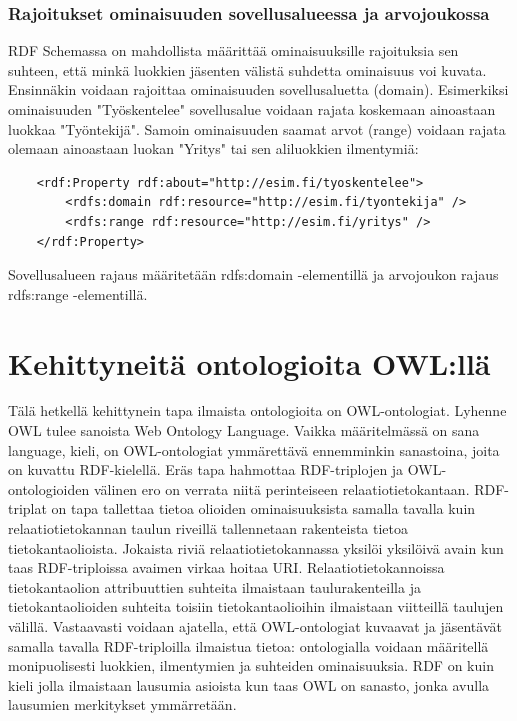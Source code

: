 \documentclass[finnish]{tktltiki2}
\theoremstyle{definition}
\theoremstyle{remark}
\begin{document}
\subsubsection{Rajoitukset ominaisuuden sovellusalueessa ja arvojoukossa}
RDF Schemassa on mahdollista määrittää ominaisuuksille rajoituksia sen suhteen, että minkä luokkien jäsenten välistä suhdetta ominaisuus voi kuvata. Ensinnäkin
voidaan rajoittaa ominaisuuden sovellusaluetta (domain). Esimerkiksi ominaisuuden "Työskentelee" sovellusalue voidaan rajata koskemaan ainoastaan luokkaa "Työntekijä". Samoin 
ominaisuuden saamat arvot (range) voidaan rajata olemaan ainoastaan luokan "Yritys" tai sen aliluokkien ilmentymiä: 
\begin{verbatim}
    <rdf:Property rdf:about="http://esim.fi/tyoskentelee">
        <rdfs:domain rdf:resource="http://esim.fi/tyontekija" />
        <rdfs:range rdf:resource="http://esim.fi/yritys" />
    </rdf:Property>
\end{verbatim}
Sovellusalueen rajaus määritetään rdfs:domain -elementillä ja arvojoukon rajaus rdfs:range -elementillä.  

\section{Kehittyneitä ontologioita OWL:llä}



Tälä hetkellä kehittynein tapa ilmaista ontologioita on OWL-ontologiat. Lyhenne OWL tulee 
sanoista Web Ontology Language. Vaikka määritelmässä on sana language, kieli, on 
OWL-ontologiat ymmärettävä ennemminkin sanastoina, joita on kuvattu RDF-kielellä.
 Eräs tapa hahmottaa RDF-triplojen ja
OWL-ontologioiden välinen ero on verrata niitä perinteiseen
relaatiotietokantaan. RDF-triplat on tapa tallettaa tietoa olioiden ominaisuuksista samalla tavalla kuin
relaatiotietokannan taulun riveillä tallennetaan rakenteista tietoa tietokantaolioista. Jokaista riviä relaatiotietokannassa
yksilöi yksilöivä avain kun taas RDF-triploissa avaimen virkaa hoitaa URI. Relaatiotietokannoissa tietokantaolion attribuuttien suhteita ilmaistaan taulurakenteilla ja tietokantaolioiden suhteita toisiin tietokantaolioihin ilmaistaan viitteillä taulujen välillä. Vastaavasti voidaan ajatella, että OWL-ontologiat kuvaavat ja jäsentävät  samalla tavalla RDF-triploilla ilmaistua tietoa: ontologialla voidaan määritellä monipuolisesti luokkien, ilmentymien ja suhteiden ominaisuuksia.  RDF on kuin kieli jolla ilmaistaan lausumia asioista kun taas OWL on sanasto, jonka avulla lausumien merkitykset ymmärretään. 
\end{document}

